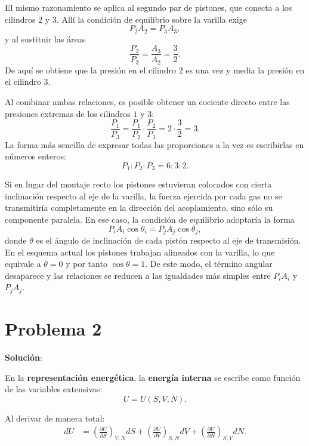 \documentclass{article}
\begin{document}
\medskip

El mismo razonamiento se aplica al segundo par de pistones, que conecta a los cilindros $2$ y $3$. Allí la condición de equilibrio sobre la varilla exige
\[
P_2 A_2 = P_3 A_3,
\]
y al sustituir las áreas
\[
\frac{P_2}{P_3} = \frac{A_3}{A_2} = \frac{3}{2}.
\]
De aquí se obtiene que la presión en el cilindro $2$ es una vez y media la presión en el cilindro $3$.

\medskip

Al combinar ambas relaciones, es posible obtener un cociente directo entre las presiones extremas de los cilindros $1$ y $3$:
\[
\frac{P_1}{P_3} = \frac{P_1}{P_2} \cdot \frac{P_2}{P_3} = 2 \cdot \frac{3}{2} = 3.
\]
La forma más sencilla de expresar todas las proporciones a la vez es escribirlas en números enteros:
\[
P_1 : P_2 : P_3 = 6 : 3 : 2.
\]

\medskip

Si en lugar del montaje recto los pistones estuvieran colocados con cierta inclinación respecto al eje de la varilla, 
la fuerza ejercida por cada gas no se transmitiría completamente en la dirección del acoplamiento, 
sino sólo su componente paralela. En ese caso, la condición de equilibrio adoptaría la forma  
\[
P_i A_i \cos\theta_i = P_j A_j \cos\theta_j,
\]  
donde $\theta$ es el ángulo de inclinación de cada pistón respecto al eje de transmisión. 
En el esquema actual los pistones trabajan alineados con la varilla, lo que equivale a $\theta = 0$ 
y por tanto $\cos\theta = 1$. De este modo, el término angular desaparece y las relaciones se reducen 
a las igualdades más simples entre $P_i A_i$ y $P_j A_j$. \vspace{0.5cm}

\section*{Problema 2}

\textcolor{Cinnabar}{\textbf{Solución}}:

En la \textbf{representación energética}, la \textcolor{orange(colorwheel)}{\textbf{energía interna}} se escribe como función de las variables extensivas:
\begin{equation}
U = U(S,V,N).
\label{eq:generalU}
\end{equation}

Al derivar de manera total:
\begin{equation}
\begin{split}
dU
&= \left( \frac{\partial U}{\partial S} \right)_{V,N} dS
 + \left( \frac{\partial U}{\partial V} \right)_{S,N} dV
 + \left( \frac{\partial U}{\partial N} \right)_{S,V} dN.
\end{split}
\label{eq:dU}
\end{equation}
\end{document}
